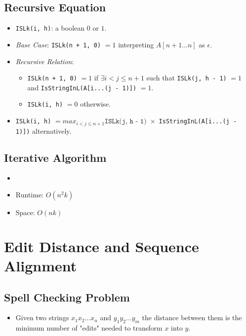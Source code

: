 \documentclass[12pt]{article}
\begin{document}
\subsection{Recursive Equation}
\begin{itemize}
    \item \texttt{ISLk(i, h)}: a boolean $0$ or $1$.
    \item \textit{Base Case}: \texttt{ISLk(n + 1, 0)} $= 1$ interpreting $A[n + 1...n]$ as $\epsilon$.
    \item \textit{Recursive Relation}:
    \begin{itemize}
        \item \texttt{ISLk(n + 1, 0)} $= 1$ if $\exists i < j \leq n + 1$ such that \texttt{ISLk(j, h - 1)} $= 1$ and \texttt{IsStringInL(A[i...(j - 1)])} $= 1$.
        \item \texttt{ISLk(i, h)} $= 0$ otherwise.
    \end{itemize}
    \item \texttt{ISLk(i, h)} $= max_{i < j \leq n + 1}\texttt{ISLk(j, h - 1) }\times$ \texttt{IsStringInL(A[i...(j - 1)])} alternatively.
\end{itemize}

\subsection{Iterative Algorithm}
\begin{itemize}
    \item[] 
    \item Runtime: $O(n^2k)$ 
    \item Space: $O(nk)$ 
\end{itemize}

\section{Edit Distance and Sequence Alignment}

\subsection{Spell Checking Problem}
\begin{itemize}
    \item Given two strings $x_1x_2...x_n$ and $y_1y_2...y_m$ the distance between them is the minimum number of "edits" needed to transform $x$ into $y$.
\end{itemize}
\end{document}

